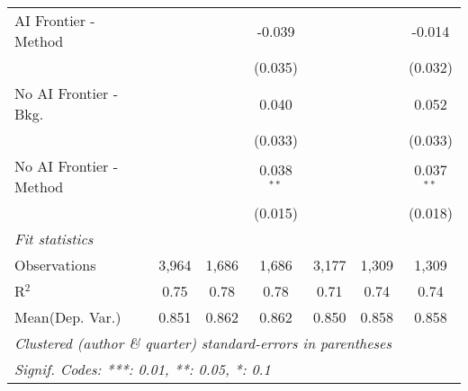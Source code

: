 \begin{tabular}{lcccccc}
   AI Frontier - Method    &         &             & -0.039       &         &         & -0.014\\   
                           &         &             & (0.035)      &         &         & (0.032)\\   
   No AI Frontier - Bkg.   &         &             & 0.040        &         &         & 0.052\\   
                           &         &             & (0.033)      &         &         & (0.033)\\   
   No AI Frontier - Method &         &             & 0.038$^{**}$ &         &         & 0.037$^{**}$\\   
                           &         &             & (0.015)      &         &         & (0.018)\\   
   \midrule
   \emph{Fit statistics}\\
   Observations            & 3,964   & 1,686       & 1,686        & 3,177   & 1,309   & 1,309\\  
   R$^2$                   & 0.75    & 0.78        & 0.78         & 0.71    & 0.74    & 0.74\\  
Mean(Dep. Var.) & 0.851 & 0.862 & 0.862 & 0.850 & 0.858 & 0.858 \\
   \midrule \midrule
   \multicolumn{7}{l}{\emph{Clustered (author \& quarter) standard-errors in parentheses}}\\
   \multicolumn{7}{l}{\emph{Signif. Codes: ***: 0.01, **: 0.05, *: 0.1}}\\
\end{tabular}
\par\endgroup
